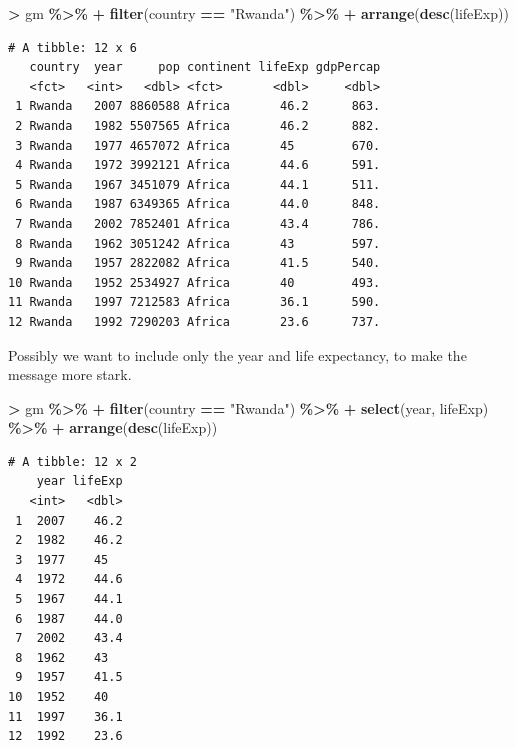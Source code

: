 \documentclass[
]{krantz}
\makeatletter
\newenvironment{Shaded}{\begin{snugshade}}{\end{snugshade}}
\newcommand{\KeywordTok}[1]{\textcolor[rgb]{0.27,0.27,0.27}{\textbf{#1}}}
\newcommand{\NormalTok}[1]{#1}
\newcommand{\OperatorTok}[1]{\textcolor[rgb]{0.43,0.43,0.43}{\textbf{#1}}}
\newcommand{\StringTok}[1]{\textcolor[rgb]{0.5,0.5,0.5}{#1}}
\newenvironment{kframe}{%
\medskip{}
\setlength{\fboxsep}{.8em}
 \def\at@end@of@kframe{}%
 \ifinner\ifhmode%
  \def\at@end@of@kframe{\end{minipage}}%
  \begin{minipage}{\columnwidth}%
 \fi\fi%
 \def\FrameCommand##1{\hskip\@totalleftmargin \hskip-\fboxsep
 \colorbox{shadecolor}{##1}\hskip-\fboxsep
     \hskip-\linewidth \hskip-\@totalleftmargin \hskip\columnwidth}%
 \MakeFramed {\advance\hsize-\width
   \@totalleftmargin\z@ \linewidth\hsize
   \@setminipage}}%
 {\par\unskip\endMakeFramed%
 \at@end@of@kframe}
\renewenvironment{Shaded}{\begin{kframe}}{\end{kframe}}
\makeatother
\begin{document}
\begin{Shaded}
\begin{Highlighting}[]
\OperatorTok{\textgreater{}}\StringTok{ }\NormalTok{gm }\OperatorTok{\%\textgreater{}\%}\StringTok{ }
\OperatorTok{+}\StringTok{   }\KeywordTok{filter}\NormalTok{(country }\OperatorTok{==}\StringTok{ "Rwanda"}\NormalTok{) }\OperatorTok{\%\textgreater{}\%}\StringTok{ }
\OperatorTok{+}\StringTok{   }\KeywordTok{arrange}\NormalTok{(}\KeywordTok{desc}\NormalTok{(lifeExp))}
\end{Highlighting}
\end{Shaded}

\begin{verbatim}
# A tibble: 12 x 6
   country  year     pop continent lifeExp gdpPercap
   <fct>   <int>   <dbl> <fct>       <dbl>     <dbl>
 1 Rwanda   2007 8860588 Africa       46.2      863.
 2 Rwanda   1982 5507565 Africa       46.2      882.
 3 Rwanda   1977 4657072 Africa       45        670.
 4 Rwanda   1972 3992121 Africa       44.6      591.
 5 Rwanda   1967 3451079 Africa       44.1      511.
 6 Rwanda   1987 6349365 Africa       44.0      848.
 7 Rwanda   2002 7852401 Africa       43.4      786.
 8 Rwanda   1962 3051242 Africa       43        597.
 9 Rwanda   1957 2822082 Africa       41.5      540.
10 Rwanda   1952 2534927 Africa       40        493.
11 Rwanda   1997 7212583 Africa       36.1      590.
12 Rwanda   1992 7290203 Africa       23.6      737.
\end{verbatim}

Possibly we want to include only the year and life expectancy, to make the message more stark.

\begin{Shaded}
\begin{Highlighting}[]
\OperatorTok{\textgreater{}}\StringTok{ }\NormalTok{gm }\OperatorTok{\%\textgreater{}\%}\StringTok{ }
\OperatorTok{+}\StringTok{   }\KeywordTok{filter}\NormalTok{(country }\OperatorTok{==}\StringTok{ "Rwanda"}\NormalTok{) }\OperatorTok{\%\textgreater{}\%}\StringTok{ }
\OperatorTok{+}\StringTok{   }\KeywordTok{select}\NormalTok{(year, lifeExp) }\OperatorTok{\%\textgreater{}\%}\StringTok{ }
\OperatorTok{+}\StringTok{   }\KeywordTok{arrange}\NormalTok{(}\KeywordTok{desc}\NormalTok{(lifeExp)) }
\end{Highlighting}
\end{Shaded}

\begin{verbatim}
# A tibble: 12 x 2
    year lifeExp
   <int>   <dbl>
 1  2007    46.2
 2  1982    46.2
 3  1977    45  
 4  1972    44.6
 5  1967    44.1
 6  1987    44.0
 7  2002    43.4
 8  1962    43  
 9  1957    41.5
10  1952    40  
11  1997    36.1
12  1992    23.6
\end{verbatim}
\end{document}
